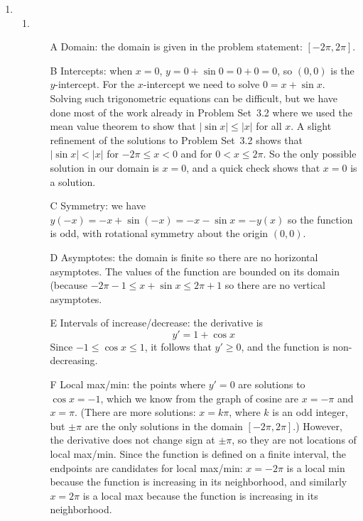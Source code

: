 \documentclass{article}
\begin{document}
\begin{enumerate}
\item %
  \begin{enumerate}
  \item %
    \begin{itemize}
    \item[A] Domain: the domain is given in the problem statement:
      $[-2\pi,2\pi]$.
    \item[B] Intercepts: when $x=0$, $y=0+\sin 0=0+0=0$, so $(0,0)$ is
      the $y$-intercept.  For the $x$-intercept we need to solve
      $0=x+\sin x$.  Solving such trigonometric equations can be
      difficult, but we have done most of the work already in Problem
      Set~3.2 where we used the mean value theorem to show that
      $|\sin x|\le |x|$ for all $x$.  A slight refinement of the
      solutions to Problem Set~3.2 shows that $|\sin x|<|x|$ for
      $-2\pi\le x<0$ and for $0<x\le 2\pi$.  So the only possible
      solution in our domain is $x=0$, and a quick check shows that
      $x=0$ is a solution.
    \item[C] Symmetry: we have $y(-x)=-x+\sin(-x)=-x-\sin x=-y(x)$ so
      the function is odd, with rotational symmetry about the origin
      $(0,0)$.
    \item[D] Asymptotes: the domain is finite so there are no
      horizontal asymptotes.  The values of the function are bounded
      on its domain (because $-2\pi-1\le x+\sin x\le 2\pi+1$ so there
      are no vertical asymptotes.
    \item[E] Intervals of increase/decrease: the derivative is
      \begin{displaymath}
        y' = 1 + \cos x
      \end{displaymath}
      Since $-1\le \cos x \le 1$, it follows that $y'\ge 0$, and the
      function is non-decreasing.
    \item[F] Local max/min: the points where $y'=0$ are solutions to
      $\cos x = -1$, which we know from the graph of cosine are
      $x=-\pi$ and $x=\pi$.  (There are more solutions: $x=k\pi$,
      where $k$ is an odd integer, but $\pm\pi$ are the only solutions
      in the domain $[-2\pi,2\pi]$.)  However, the derivative does not
      change sign at $\pm\pi$, so they are not locations of local
      max/min.  Since the function is defined on a finite interval,
      the endpoints are candidates for local max/min: $x=-2\pi$ is a
      local min because the function is increasing in its
      neighborhood, and similarly $x=2\pi$ is a local max because the
      function is increasing in its neighborhood.

\end{itemize}
\end{enumerate}
\end{enumerate}
\end{document}
